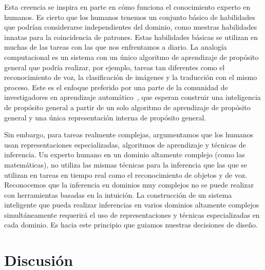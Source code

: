 Esta creencia se inspira en parte en cómo funciona el conocimiento experto en humanos. Es cierto que los humanos tenemos un conjunto básico de habilidades que podrían considerarse independientes del dominio, como nuestras habilidades innatas para la coincidencia de patrones. Estas habilidades básicas se utilizan en muchas de las tareas con las que nos enfrentamos a diario.
La analogía computacional es un sistema con un único algoritmo de aprendizaje de propósito general que podría realizar, por ejemplo, tareas tan diferentes como el reconocimiento de voz, la clasificación de imágenes y la traducción con el mismo proceso.
Este es el enfoque preferido por una parte de la comunidad de investigadores en aprendizaje automático~\cite{kaiser2017one},
que esperan construir una inteligencia de propósito general a partir de un solo algoritmo de aprendizaje de propósito general y una única representación interna de propósito general.

Sin embargo, para tareas realmente complejas, argumentamos que los humanos usan representaciones especializadas, algoritmos de aprendizaje y técnicas de inferencia. Un experto humano en un dominio altamente complejo (como las matemáticas), no utiliza las mismas técnicas para la inferencia que las que se utilizan en tareas en tiempo real como el reconocimiento de objetos y de voz. Reconocemos que la inferencia en dominios muy complejos no se puede realizar con herramientas basadas en la intuición. La construcción de un sistema inteligente que pueda realizar inferencias en varios dominios altamente complejos simultáneamente requerirá el uso de representaciones y técnicas especializadas en cada dominio. Es hacia este principio que guiamos nuestras decisiones de diseño.

  \section{Discusión}
